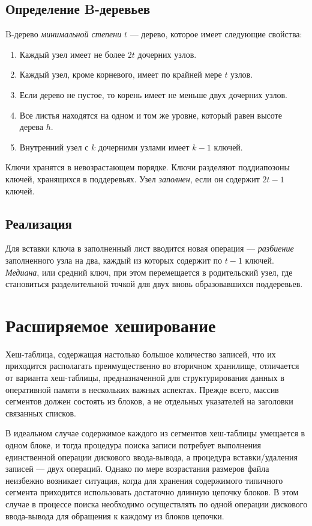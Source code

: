 \subsection{Определение B-деревьев}
B-дерево \emph{минимальной степени} $t$ — дерево, которое имеет следующие свойства:
\begin{enumerate}
  \item Каждый узел имеет не более $2t$ дочерних узлов.
  \item Каждый узел, кроме корневого, имеет по крайней мере $t$ узлов.
  \item Если дерево не пустое, то корень имеет не меньше двух дочерних узлов.
  \item Все листья находятся на одном и том же уровне, который равен высоте дерева $h$.
  \item Внутренний узел с $k$ дочерними узлами имеет $k - 1$ ключей.
\end{enumerate}

Ключи хранятся в невозрастающем порядке. Ключи разделяют поддиапозоны ключей, хранящихся в поддеревьях. Узел \emph{заполнен}, если он содержит $2t - 1$ ключей.

\subsection{Реализация}
Для вставки ключа в заполненный лист вводится новая операция — \emph{разбиение} заполненного узла на два, каждый из которых содержит по $t - 1$ ключей. \emph{Медиана}, или средний ключ,  при этом перемещается в родительский узел, где становиться разделительной точкой для двух вновь образовавшихся поддеревьев.



\section {Расширяемое хеширование}
\label{sec:ext-hashing}
Хеш-таблица, содержащая настолько большое количество записей, что их приходится располагать преимущественно во вторичном хранилище, отличается от варианта хеш-таблицы, предназначенной для структурирования данных в оперативной памяти в нескольких важных аспектах. Прежде всего, массив сегментов должен состоять из блоков, а не отдельных указателей на заголовки связанных списков.

В идеальном случае содержимое каждого из сегментов хеш-таблицы умещается в одном блоке, и тогда процедура поиска записи потребует выполнения единственной операции дискового ввода-вывода, а процедура вставки/удаления записей — двух операций. Однако по мере возрастания размеров файла неизбежно возникает ситуация, когда для хранения содержимого типичного сегмента приходится использовать достаточно длинную цепочку блоков. В этом случае в процессе поиска необходимо осуществлять по одной операции дискового ввода-вывода для обращения к каждому из блоков цепочки.

